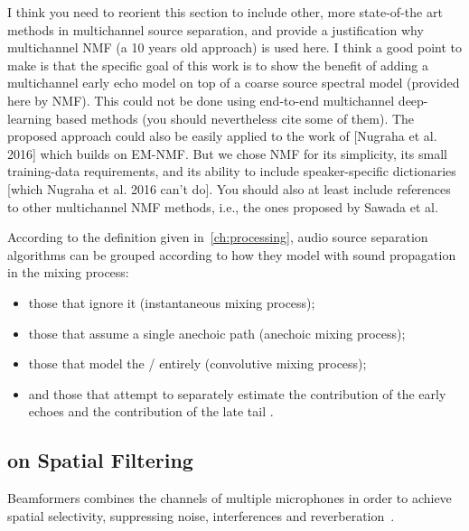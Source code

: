 I think you need to reorient this section to include other, more state-of-the art methods in multichannel source separation, and provide a justification why multichannel NMF (a 10 years old approach) is used here.
I think a good point to make is that the specific goal of this work is to show the benefit of adding a multichannel early echo model on top of a coarse source spectral model (provided here by NMF).
This could not be done using end-to-end multichannel deep-learning based methods (you should nevertheless cite some of them).
The proposed approach could also be easily applied to the work of [Nugraha et al. 2016] which builds on EM-NMF.
But we chose NMF for its simplicity, its small training-data requirements, and its ability to include speaker-specific dictionaries [which Nugraha et al. 2016 can't do].
You should also at least include references to other multichannel NMF methods, i.e., the ones proposed by Sawada et al.

According to the definition given in~\cref{ch:processing}, audio source separation algorithms can be grouped according to how they model with sound propagation in the mixing process:
\begin{itemize}
    \item those that ignore it  (instantaneous mixing process);
    \item those that assume a single anechoic path  (anechoic mixing process);
    \item those that model the \RTFs/ entirely  (convolutive mixing process);
    \item and those that attempt to separately estimate the contribution of the early echoes and the contribution of the late tail .
\end{itemize}

\subsection{on Spatial Filtering}
Beamformers combines the channels of multiple microphones in order to achieve spatial selectivity, suppressing noise, interferences and reverberation~.


